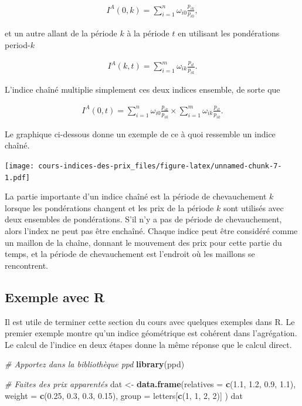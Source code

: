 \documentclass[]{article}
\newenvironment{Shaded}{\begin{snugshade}}{\end{snugshade}}
\newcommand{\CommentTok}[1]{\textcolor[rgb]{0.56,0.35,0.01}{\textit{#1}}}
\newcommand{\DataTypeTok}[1]{\textcolor[rgb]{0.13,0.29,0.53}{#1}}
\newcommand{\DecValTok}[1]{\textcolor[rgb]{0.00,0.00,0.81}{#1}}
\newcommand{\FloatTok}[1]{\textcolor[rgb]{0.00,0.00,0.81}{#1}}
\newcommand{\KeywordTok}[1]{\textcolor[rgb]{0.13,0.29,0.53}{\textbf{#1}}}
\newcommand{\NormalTok}[1]{#1}
\newcommand{\StringTok}[1]{\textcolor[rgb]{0.31,0.60,0.02}{#1}}
\begin{document}
\begin{align*}
I^{A}(0, k) = \sum_{i = 1}^{n} \omega_{i0} \frac{p_{ik}}{p_{i0}},
\end{align*}

et un autre allant de la période \(k\) à la période \(t\) en utilisant les pondérations period-\(k\)

\begin{align*}
I^{A}(k, t) = \sum_{i = 1}^{m} \omega_{ik} \frac{p_{it}}{p_{ik}}.
\end{align*}

L'indice chaîné multiplie simplement ces deux indices ensemble, de sorte que

\begin{align*}
I^{A}(0, t) = \sum_{i = 1}^{n} \omega_{i0} \frac{p_{ik}}{p_{i0}} \times \sum_{i = 1}^{m} \omega_{ik} \frac{p_{it}}{p_{ik}}.
\end{align*}

Le graphique ci-dessous donne un exemple de ce à quoi ressemble un indice chaîné.

\texttt{[image: cours-indices-des-prix\_files/figure-latex/unnamed-chunk-7-1.pdf]}

La partie importante d'un indice chaîné est la période de chevauchement \(k\) lorsque les pondérations changent et les prix de la période \(k\) sont utilisés avec deux ensembles de pondérations. S'il n'y a pas de période de chevauchement, alors l'index ne peut pas être enchaîné. Chaque indice peut être considéré comme un maillon de la chaîne, donnant le mouvement des prix pour cette partie du temps, et la période de chevauchement est l'endroit où les maillons se rencontrent.

\hypertarget{exemple-avec-r-1}{%
\subsection{Exemple avec R}\label{exemple-avec-r-1}}

Il est utile de terminer cette section du cours avec quelques exemples dans R. Le premier exemple montre qu'un indice géométrique est cohérent dans l'agrégation. Le calcul de l'indice en deux étapes donne la même réponse que le calcul direct.

\begin{Shaded}
\begin{Highlighting}[]
\CommentTok{# Apportez dans la bibliothèque ppd}
\KeywordTok{library}\NormalTok{(ppd)}

\CommentTok{# Faites des prix apparentés}
\NormalTok{dat <-}\StringTok{ }\KeywordTok{data.frame}\NormalTok{(}\DataTypeTok{relatives =} \KeywordTok{c}\NormalTok{(}\FloatTok{1.1}\NormalTok{, }\FloatTok{1.2}\NormalTok{, }\FloatTok{0.9}\NormalTok{, }\FloatTok{1.1}\NormalTok{),}
                  \DataTypeTok{weight =} \KeywordTok{c}\NormalTok{(}\FloatTok{0.25}\NormalTok{, }\FloatTok{0.3}\NormalTok{, }\FloatTok{0.3}\NormalTok{, }\FloatTok{0.15}\NormalTok{),}
                  \DataTypeTok{group =}\NormalTok{ letters[}\KeywordTok{c}\NormalTok{(}\DecValTok{1}\NormalTok{, }\DecValTok{1}\NormalTok{, }\DecValTok{2}\NormalTok{, }\DecValTok{2}\NormalTok{)]}
\NormalTok{)}
\NormalTok{dat}
\end{Highlighting}
\end{Shaded}
\end{document}
